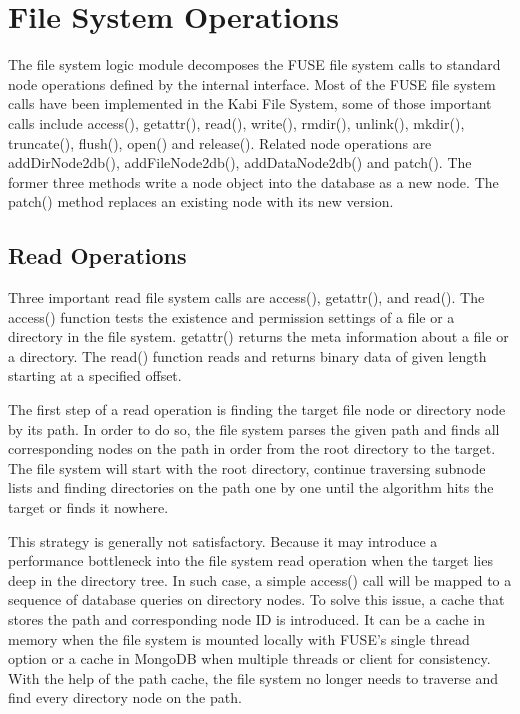 \section{File System Operations}

    The file system logic module decomposes the FUSE file system calls to standard node operations defined by the internal interface. Most of the FUSE file system calls have been implemented in the Kabi File System, some of those important calls include access(), getattr(), read(), write(), rmdir(), unlink(), mkdir(), truncate(), flush(), open() and release(). Related node operations are addDirNode2db(), addFileNode2db(), addDataNode2db() and patch(). The former three methods write a node object into the database as a new node. The patch() method replaces an existing node with its new version.

\subsection{Read Operations}

    Three important read file system calls are access(), getattr(), and read(). The access() function tests the existence and permission settings of a file or a directory in the file system. getattr() returns the meta information about a file or a directory. The read() function reads and returns binary data of given length starting at a specified offset.

    The first step of a read operation is finding the target file node or directory node by its path. In order to do so, the file system parses the given path and finds all corresponding nodes on the path in order from the root directory to the target. The file system will start with the root directory, continue traversing subnode lists and finding directories on the path one by one until the algorithm hits the target or finds it nowhere.

    This strategy is generally not satisfactory. Because it may introduce a performance bottleneck into the file system read operation when the target lies deep in the directory tree. In such case, a simple access() call will be mapped to a sequence of database queries on directory nodes. To solve this issue, a cache that stores the path and corresponding node ID is introduced. It can be a cache in memory when the file system is mounted locally with FUSE's single thread option or a cache in MongoDB when multiple threads or client for consistency. With the help of the path cache, the file system no longer needs to traverse and find every directory node on the path.

